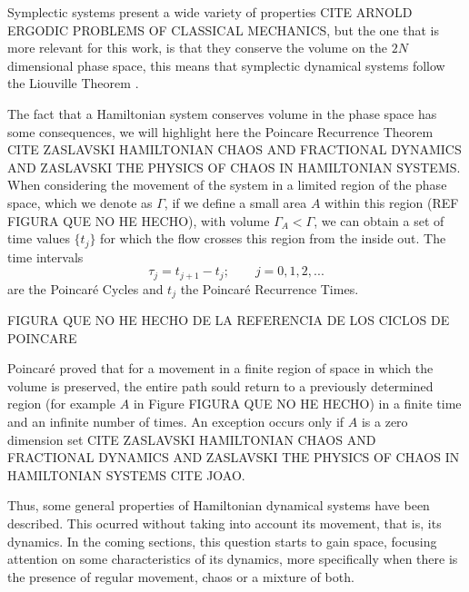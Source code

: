 Symplectic systems present a wide variety of properties CITE ARNOLD ERGODIC PROBLEMS OF CLASSICAL MECHANICS, but the one that is more relevant for this work, is that they conserve the volume on the $2N$ dimensional phase space, this means that symplectic dynamical systems follow the Liouville Theorem \cite{ottChaosDynamicalSystems2002}.\par

The fact that a Hamiltonian system conserves volume in the phase space has some consequences, we will highlight here the Poincar\´e  Recurrence Theorem CITE ZASLAVSKI HAMILTONIAN CHAOS AND FRACTIONAL DYNAMICS AND ZASLAVSKI THE PHYSICS OF CHAOS IN HAMILTONIAN SYSTEMS. When considering the movement of the system in a limited region of the phase space, which we denote as $\Gamma$, if we define a small area $A$ within this region (REF FIGURA QUE NO HE HECHO), with volume $\Gamma_A < \Gamma$, we can obtain a set of time values $\{ t_j\}$ for which the flow crosses this region from the inside out. The time intervals
\begin{equation}
\tau_j=t_{j+1}-t_j;\qquad j=0,1,2,...
\end{equation}
are the Poincaré Cycles and $t_j$ the Poincaré Recurrence Times. \par



FIGURA QUE NO HE HECHO DE LA REFERENCIA DE LOS CICLOS DE POINCARE\par

Poincaré proved that for a movement in a finite region of space in which the volume is preserved, the entire path sould return to a previously determined region (for example $A$ in Figure FIGURA QUE NO HE HECHO) in a finite time and an infinite number of times. An exception occurs only if $A$ is a zero dimension set CITE ZASLAVSKI HAMILTONIAN CHAOS AND FRACTIONAL DYNAMICS AND ZASLAVSKI THE PHYSICS OF CHAOS IN HAMILTONIAN SYSTEMS CITE JOAO.\par 

Thus, some general properties of Hamiltonian dynamical systems have been described. This ocurred without taking into account its movement, that is, its dynamics. In the coming sections, this question starts to gain space, focusing attention on some characteristics of its dynamics, more specifically when there is the presence of regular movement, chaos or a mixture of both.



